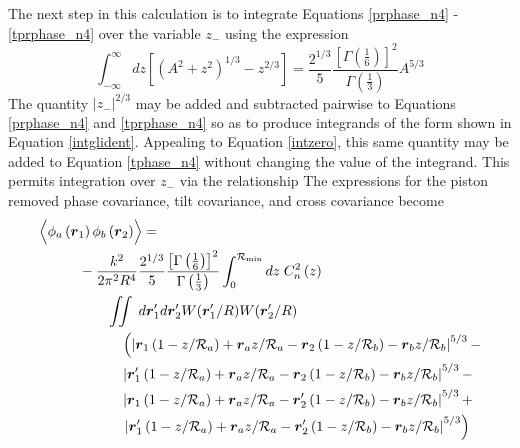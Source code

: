 The next step in this calculation is to integrate Equations
\ref{prphase_n4} - \ref{tprphase_n4} over the variable $z_{-}$
using the expression 
\begin{equation}\label{intglident}
\int_{-\infty}^{\infty} dz\left[\left(A^{2} + z^{2}\right)^{1/3} - z^{2/3}\right] = 
\frac{2^{1/3}}{5}\frac{\left[\Gamma\left(\frac{1}{6}\right)\right]^{2}}{\Gamma\left(\frac{1}{3}\right)} A^{5/3}
\end{equation}
The quantity $\left\vert z_{-}\right\vert^{2/3}$ may be added and
subtracted pairwise to Equations \ref{prphase_n4} and
\ref{tprphase_n4} so as to produce integrands of the form shown in
Equation \ref{intglident}.  Appealing to Equation \ref{intzero}, this
same quantity may be added to Equation \ref{tphase_n4} without
changing the value of the integrand.  This permits integration over
$z_{-}$ via the relationship The expressions for the piston removed
phase covariance, tilt covariance, and cross covariance become
\begin{equation}\label{prphase_n5}
\begin{aligned}
&\left\langle \vphantom{\hat{\phi}_{a}} \phi_{a}\left(\boldsymbol{r}_{1}\right) \phi_{b}\left(\boldsymbol{r}_{2}\right)\right\rangle = \\
&\quad\quad\quad
-\frac{k^{2}}{2\pi^{2}R^{4}} 
\frac{2^{1/3}}{5}\frac{\left[\Gamma\left(\frac{1}{6}\right)\right]^{2}}{\Gamma\left(\frac{1}{3}\right)} 
\int_{0}^{\mathcal{R}_{\rm min}} dz\;C_{n}^{2}\left(z\right) \\
&\quad\quad\quad\quad\quad
\iint \; d\boldsymbol{r}^{\prime}_{1}d\boldsymbol{r}^{\prime}_{2}  
W(\boldsymbol{r}^{\prime}_{1}/R) W(\boldsymbol{r}^{\prime}_{2}/R) \\
&\quad\quad\quad\quad\quad\quad
\left(
\left\vert \boldsymbol{r}_{1}\left(1-z/\mathcal{R}_{a}\right) + \boldsymbol{r}_{a} z/\mathcal{R}_{a} - 
\boldsymbol{r}_{2}\left(1-z/\mathcal{R}_{b}\right) - \boldsymbol{r}_{b} z/\mathcal{R}_{b}\right\vert^{5/3} -
\right. \\
& \quad\quad\quad\quad\quad\quad
\left\vert \boldsymbol{r}^{\prime}_{1}\left(1-z/\mathcal{R}_{a}\right) + \boldsymbol{r}_{a} z/\mathcal{R}_{a} - 
\boldsymbol{r}_{2}\left(1-z/\mathcal{R}_{b}\right) - \boldsymbol{r}_{b} z/\mathcal{R}_{b}\right\vert^{5/3} - \\
& \quad\quad\quad\quad\quad\quad
\left\vert \boldsymbol{r}_{1}\left(1-z/\mathcal{R}_{a}\right) + \boldsymbol{r}_{a} z/\mathcal{R}_{a} - 
\boldsymbol{r}^{\prime}_{2}\left(1-z/\mathcal{R}_{b}\right) - \boldsymbol{r}_{b} z/\mathcal{R}_{b}\right\vert^{5/3} + \\
& \quad\quad\quad\quad\quad\quad
\left.
\left\vert \boldsymbol{r}^{\prime}_{1}\left(1-z/\mathcal{R}_{a}\right) + \boldsymbol{r}_{a} z/\mathcal{R}_{a} - 
\boldsymbol{r}^{\prime}_{2}\left(1-z/\mathcal{R}_{b}\right) - \boldsymbol{r}_{b} z/\mathcal{R}_{b}\right\vert^{5/3}\right)
\end{aligned}
\end{equation}

